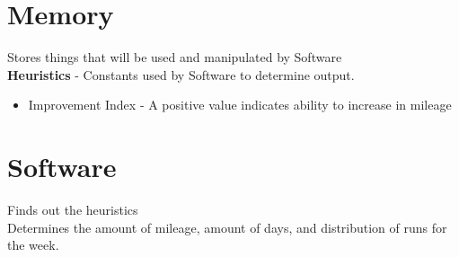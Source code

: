 \documentclass{article}
\begin{document}
\section{Memory}
Stores things that will be used and manipulated by Software\\
\indent \textbf{Heuristics} - Constants used by Software to determine output.
\begin{itemize}
\item Improvement Index - A positive value indicates ability to increase in mileage
\end{itemize}
\section{Software}
Finds out the heuristics\\
Determines the amount of mileage, amount of days, and distribution of runs for the week.
\end{document}
